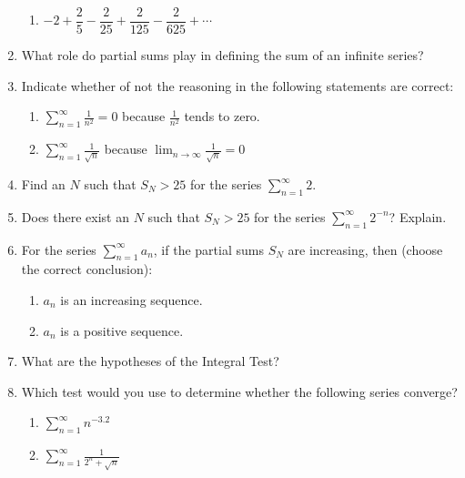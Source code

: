 \documentclass{nosvagor-notes}
\begin{document}
\begin{enumerate}
\begin{enumerate}
      \item \(-2 + \dfrac{2}{5} - \dfrac{2}{25} + \dfrac{2}{125} - \dfrac{2}{625} + \cdots \)
    \end{enumerate}
  \newpage

  \item What role do partial sums play in defining the sum of an infinite
    series?
    \vspace{90pt}

  \item Indicate whether of not the reasoning in the following statements are
    correct:
    \begin{enumerate}
      \item \(\displaystyle \sum_{n=1}^{\infty} \frac{1}{n^2} = 0\) because
        \(\frac{1}{n^2}\) tends to zero.
      \vspace{110pt}

      \item \(\displaystyle \sum_{n=1}^{\infty} \frac{1}{\sqrt{n}}\) because
        \(\displaystyle \lim_{n \to \infty}\frac{1}{\sqrt{n} } = 0\)
      \vspace{110pt}
    \end{enumerate}

  \item Find an \(N\) such that \(S_N > 25\) for the series \(\displaystyle
    \sum_{n=1}^{\infty} 2\).
    \vspace{110pt}

  \item Does there exist an \(N\) such that \(S_N > 25\) for the series
    \(\displaystyle \sum_{n=1}^{\infty} 2^{-n}\)? Explain.
    \vspace{90pt}

  \newpage

  \item For the series \(\displaystyle \sum_{n=1}^{\infty} a_n\), if the
    partial sums \(S_N\) are increasing, then (choose the correct conclusion):
    \begin{enumerate}
      \item \({a_n}\) is an increasing sequence.
      \item \({a_n}\) is a positive sequence.
    \end{enumerate}
  \vspace{60pt}

  \item What are the hypotheses of the Integral Test?
  \vspace{110pt}

  \item Which test would you use to determine whether the following series converge?
  \begin{enumerate}
    \item \(\displaystyle \sum_{n=1}^{\infty} n^{-3.2}\)
  \vspace{110pt}

    \item \(\displaystyle \sum_{n=1}^{\infty} \frac{1}{2^n + \sqrt{n} }\)
  \vspace{110pt}
  \end{enumerate}

\end{enumerate}
\end{document}
